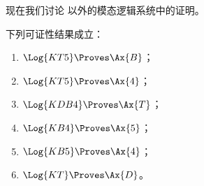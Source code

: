 \documentclass[../../../include/open-logic-section]{subfiles}
\begin{document}


现在我们讨论  以外的模态逻辑系统中的证明。

\begin{prop}
下列可证性结果成立：
  \begin{enumerate}
  \item $\Log{KT5} \Proves \Ax{B}$；
  \item $\Log{KT5} \Proves \Ax{4}$；
  \item $\Log{KDB4} \Proves \Ax{T}$；
  \item $\Log{KB4} \Proves \Ax{5}$；
  \item $\Log{KB5} \Proves \Ax{4}$；
  \item {}$\Log{KT} \Proves \Ax{D}$。
  \end{enumerate}
\end{prop}
\end{document}
